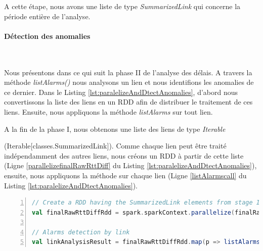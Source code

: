 A cette étape, nous avons une liste de type \textit{SummarizedLink} qui concerne  la période entière de l'analyse. 



\paragraph{Détection des anomalies}~

Nous présentons dans ce qui suit la phase II de l'analyse des délais. A travers la méthode \textit{listAlarms()} nous analysons un lien et nous identifions les anomalies de ce dernier. Dans le Listing \ref{lst:paralelizeAndDtectAnomalies}, d'abord nous convertissons la liste des liens en un RDD afin de distribuer le traitement de ces liens. Ensuite, nous appliquons la méthode \textit{listAlarms} sur tout lien. 


A la fin de la phase I, nous obtenons une liste des liens de type \textit{Iterable}  

(Iterable[classes.SummarizedLink]). Comme chaque lien peut être traité indépendamment des autres liens, nous créons un RDD à partir de cette liste (Ligne \ref{parallelizefinalRawRttDiff} du Listing \ref{lst:paralelizeAndDtectAnomalies}), ensuite, nous appliquons la méthode sur chaque lien (Ligne \ref{listAlarmscall} du Listing \ref{lst:paralelizeAndDtectAnomalies}).  

\begin{lstlisting}[language=scala,firstnumber=1, caption={Détection des alarmes des liens},label={lst:paralelizeAndDtectAnomalies}, basicstyle = \footnotesize,escapechar=|,numbers=left,
stepnumber=1]
// Create a RDD having the SummarizedLink elements from stage I
val finalRawRttDiffRdd = spark.sparkContext.parallelize(finalRawRttDiff.toSeq) |\label{parallelizefinalRawRttDiff}|

// Alarms detection by link
val linkAnalysisResult = finalRawRttDiffRdd.map(p => listAlarms(spark, p, timewindow, rangeDates)) |\label{listAlarmscall}|
\end{lstlisting}

